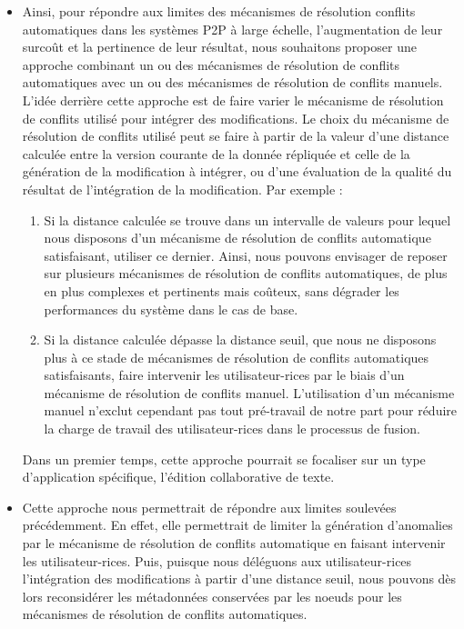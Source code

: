 \begin{itemize}
    \item Ainsi, pour répondre aux limites des mécanismes de résolution conflits automatiques dans les systèmes \ac{P2P} à large échelle, \ie l'augmentation de leur surcoût et la pertinence de leur résultat, nous souhaitons proposer une approche combinant un ou des mécanismes de résolution de conflits automatiques avec un ou des mécanismes de résolution de conflits manuels.
        L'idée derrière cette approche est de faire varier le mécanisme de résolution de conflits utilisé pour intégrer des modifications.
        Le choix du mécanisme de résolution de conflits utilisé peut se faire à partir de la valeur d'une distance calculée entre la version courante de la donnée répliquée et celle de la génération de la modification à intégrer, ou d'une évaluation de la qualité du résultat de l'intégration de la modification.
        Par exemple :
        \begin{enumerate}
            \item Si la distance calculée se trouve dans un intervalle de valeurs pour lequel nous disposons d'un mécanisme de résolution de conflits automatique satisfaisant, utiliser ce dernier.
                Ainsi, nous pouvons envisager de reposer sur plusieurs mécanismes de résolution de conflits automatiques, de plus en plus complexes et pertinents mais coûteux, sans dégrader les performances du système dans le cas de base.
            \item Si la distance calculée dépasse la distance seuil, \ie que nous ne disposons plus à ce stade de mécanismes de résolution de conflits automatiques satisfaisants, faire intervenir les utilisateur-rices par le biais d'un mécanisme de résolution de conflits manuel.
                L'utilisation d'un mécanisme manuel n'exclut cependant pas tout pré-travail de notre part pour réduire la charge de travail des utilisateur-rices dans le processus de fusion.
        \end{enumerate}
        Dans un premier temps, cette approche pourrait se focaliser sur un type d'application spécifique, \eg l'édition collaborative de texte.
    \item Cette approche nous permettrait de répondre aux limites soulevées précédemment.
        En effet, elle permettrait de limiter la génération d'anomalies par le mécanisme de résolution de conflits automatique en faisant intervenir les utilisateur-rices.
        Puis, puisque nous déléguons aux utilisateur-rices l'intégration des modifications à partir d'une distance seuil, nous pouvons dès lors reconsidérer les métadonnées conservées par les noeuds pour les mécanismes de résolution de conflits automatiques.

\end{itemize}
